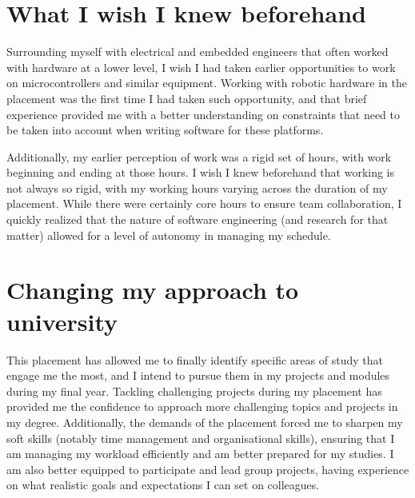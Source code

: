 \section{What I wish I knew beforehand}

Surrounding myself with electrical and embedded engineers that often worked with hardware at a lower
level, I wish I had taken earlier opportunities to work on microcontrollers and similar equipment.
Working with robotic hardware in the placement was the first time I had taken such opportunity, and
that brief experience provided me with a better understanding on constraints that need to be taken
into account when writing software for these platforms.

Additionally, my earlier perception of work was a rigid set of hours, with work beginning and ending
at those hours. I wish I knew beforehand that working is not always so rigid, with my working hours
varying across the duration of my placement. While there were certainly core hours to ensure team
collaboration, I quickly realized that the nature of software engineering (and research for that
matter) allowed for a level of autonomy in managing my schedule.

\section{Changing my approach to university}

This placement has allowed me to finally identify specific areas of study that engage me the most,
and I intend to pursue them in my projects and modules during my final year. Tackling challenging
projects during my placement has provided me the confidence to approach more challenging topics and
projects in my degree. Additionally, the demands of the placement forced me to sharpen my soft
skills (notably time management and organisational skills), ensuring that I am managing my workload
efficiently and am better prepared for my studies. I am also better equipped to participate and lead
group projects, having experience on what realistic goals and expectations I can set on colleagues.
